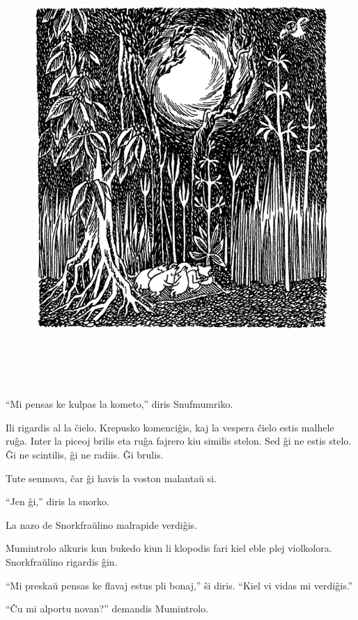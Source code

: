 \begin{figure}[htbp]
\centering
\includegraphics[width=425pt,height=467pt]{5-7.png}
\caption{}
\label{5-7}
\end{figure}

``Mi pensas ke kulpas la kometo,'' diris Snufmumriko.

Ili rigardis al la ĉielo. Krepusko komenciĝis, kaj la vespera ĉielo estis malhele ruĝa. Inter la piceoj brilis eta ruĝa fajrero kiu similis stelon. Sed ĝi ne estis stelo. Ĝi ne scintilis, ĝi ne radiis. Ĝi brulis.

Tute senmova, ĉar ĝi havis la voston malantaŭ si.

``Jen ĝi,'' diris la snorko.

La nazo de Snorkfraŭlino malrapide verdiĝis.

Mumintrolo alkuris kun bukedo kiun li klopodis fari kiel eble plej violkolora. Snorkfraŭlino rigardis ĝin.

``Mi preskaŭ pensas ke flavaj estus pli bonaj,'' ŝi diris. ``Kiel vi vidas mi verdiĝis.''

``Ĉu mi alportu novan?'' demandis Mumintrolo.

